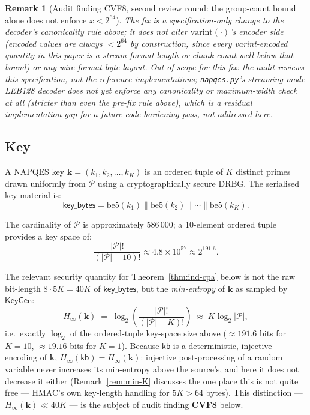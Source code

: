 \documentclass[11pt,a4paper]{article}
\newtheorem{remark}[theorem]{Remark}
\begin{document}
\begin{remark}[Audit finding CVF8, second review round: the group-count bound alone does not enforce $x<2^{64}$]
\label{rem:v2cvf8}
The fix is a specification-only change to the decoder's canonicality rule
above; it does not alter $\mathrm{varint}(\cdot)$'s encoder side (encoded
values are always $<2^{64}$ by construction, since every varint-encoded
quantity in this paper is a stream-format length or chunk count well below
that bound) or any wire-format byte layout. Out of scope for this fix: the
audit reviews this specification, not the reference implementations;
\texttt{napqes.py}'s streaming-mode LEB128 decoder does not yet enforce
any canonicality or maximum-width check at all (stricter than even the
pre-fix rule above), which is a residual implementation gap for a future
code-hardening pass, not addressed here.
\end{remark}

\subsection{Key}

A NAPQES key $\mathbf{k} = (k_1, k_2, \ldots, k_K)$ is an ordered tuple
of $K$ distinct primes drawn uniformly from $\mathcal{P}$ using a
cryptographically secure DRBG.  The serialised key material is:
\[
  \mathsf{key\_bytes} = \mathrm{be5}(k_1) \| \mathrm{be5}(k_2) \| \cdots \| \mathrm{be5}(k_K).
\]

The cardinality of $\mathcal{P}$ is approximately 586\,000; a 10-element
ordered tuple provides a key space of:
\[
  \frac{|\mathcal{P}|!}{(|\mathcal{P}|-10)!} \approx 4.8 \times 10^{57} \approx 2^{191.6}.
\]

The relevant security quantity for Theorem~\ref{thm:ind-cpa} below is not
the raw bit-length $8\cdot 5K = 40K$ of $\mathsf{key\_bytes}$, but the
\emph{min-entropy} of $\mathbf{k}$ as sampled by $\mathsf{KeyGen}$:
\[
  H_\infty(\mathbf{k}) \;=\; \log_2\!\left(\frac{|\mathcal{P}|!}{(|\mathcal{P}|-K)!}\right)
  \;\approx\; K\log_2|\mathcal{P}|,
\]
i.e.\ exactly $\log_2$ of the ordered-tuple key-space size above
($\approx 191.6$ bits for $K=10$, $\approx 19.16$ bits for $K=1$). Because
$\mathsf{kb}$ is a deterministic, injective encoding of $\mathbf{k}$,
$H_\infty(\mathsf{kb}) = H_\infty(\mathbf{k})$: injective post-processing
of a random variable never increases its min-entropy above the source's,
and here it does not decrease it either (Remark~\ref{rem:min-K} discusses
the one place this is not quite free --- HMAC's own key-length handling
for $5K>64$ bytes). This distinction --- $H_\infty(\mathbf{k}) \ll 40K$ ---
is the subject of audit finding \textbf{CVF8} below.
\end{document}
